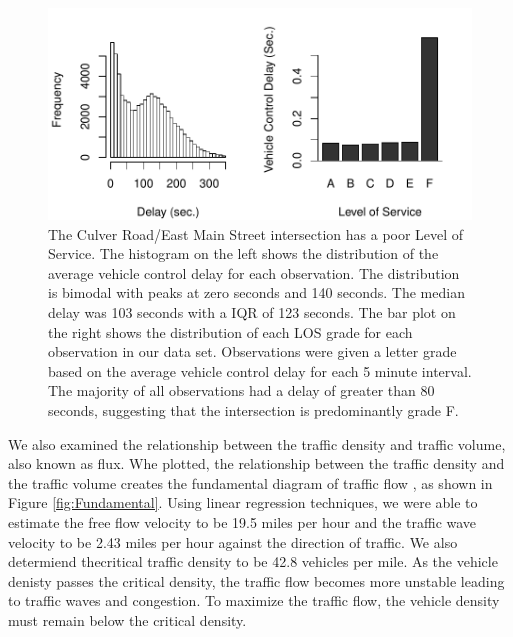 \documentclass{report}
\begin{document}
\begin{figure}[h]
\centering
\includegraphics{upstat_report-LOCplot}
\caption{ The Culver Road/East Main Street
intersection has a poor Level of Service. The histogram on the left shows the
distribution of the average vehicle control delay for each observation. The
distribution is bimodal with peaks at zero seconds and 140 seconds. The median
delay was 103 seconds with a IQR of
123 seconds. The bar plot on the right shows the
distribution of each LOS grade for each observation in our data set.
Observations were given a letter grade based on the average vehicle control
delay for each 5 minute interval. The majority of all observations had a delay
of greater than 80 seconds, suggesting that the intersection is predominantly grade
F.}
\label{fig:LOSfigure}
\end{figure}

We also examined the relationship between the traffic density and traffic volume,
also known as flux. Whe plotted, the relationship between the traffic density
and the traffic volume creates the fundamental diagram of traffic flow
\cite{HCM}, as shown in Figure \ref{fig:Fundamental}. Using linear regression techniques, we
were able to estimate the free flow velocity to be 19.5 miles per hour and the
traffic wave velocity to be 2.43 miles per hour against the direction of traffic.
We also determiend thecritical traffic density to be 42.8 vehicles per mile.
As the vehicle denisty passes the critical density, the traffic flow becomes
more unstable leading to traffic waves and congestion. To maximize
the traffic flow, the vehicle density must remain below the critical density.
\end{document}
